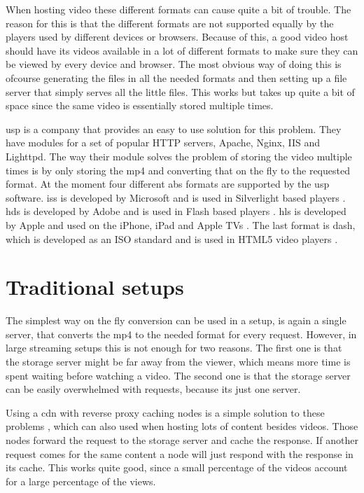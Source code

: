 \documentclass[twoside,openright]{uva-bachelor-thesis}
\begin{document}
When hosting video these different formats can cause quite a bit of trouble.
The reason for this is that the different formats are not supported equally by
the players used by different devices or browsers. Because of this, a good video
host should have its videos available in a lot of different formats to make sure
they can be viewed by every device and browser. The most obvious way of doing
this is ofcourse generating the files in all the needed formats and then setting
up a file server that simply serves all the little files. This works but takes
up quite a bit of space since the same video is essentially stored multiple
times.

\Gls{usp} is a company that provides an easy to use solution for this problem.
They have modules for a set of popular HTTP servers, Apache, Nginx, IIS and
Lighttpd. The way their module solves the problem of storing the video multiple
times is by only storing the mp4 and converting that on the fly to the requested
format. At the moment four different \gls{abs} formats are supported by the
\gls{usp} software. \Gls{iss} is developed by Microsoft and is used in
Silverlight based players \autocite{iss}. \Gls{hds} is developed by Adobe and is
used in Flash based players \autocite{hds}.  \Gls{hls} is developed by Apple and
used on the iPhone, iPad and Apple TVs \autocite{hls}. The last format is
\gls{dash}, which is developed as an ISO standard and is used in \textsc{HTML5}
video players \autocite{dash}.


\section{Traditional setups}
The simplest way on the fly conversion can be used in a setup, is again a
single server, that converts the mp4 to the needed format for every request.
However, in large streaming setups this is not enough for two reasons. The first
one is that the storage server might be far away from the viewer, which means
more time is spent waiting before watching a video. The second one is that the
storage server can be easily overwhelmed with requests, because its just one
server.

Using a \gls{cdn} with reverse proxy caching nodes is a simple solution to these
problems \autocites{cdns}{revproxy}, which can also used when hosting lots of
content besides videos. Those nodes forward the request to the storage server
and cache the response. If another request comes for the same content a node
will just respond with the response in its cache. This works quite good, since a
small percentage of the videos account for a large percentage of the views.
\end{document}

